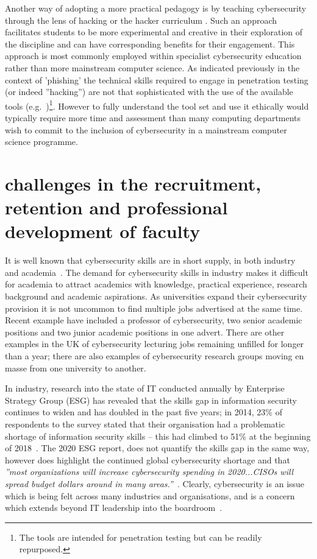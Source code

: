 \documentclass[conference]{IEEEtran}
\begin{document}
Another way of adopting a more practical pedagogy is by teaching cybersecurity through the lens of hacking or the hacker curriculum \cite{bratus2010teaching}. Such an approach facilitates students to be more experimental and creative in their exploration of the discipline and can have corresponding benefits for their engagement. This approach is most commonly employed within specialist cybersecurity education rather than more mainstream computer science. As indicated previously in the context of 'phishing' the technical skills required to engage in penetration testing (or indeed ''hacking'') are not that sophisticated with the use of the available tools (e.g.~\cite{KaliLinux,metasploit})\footnote{The tools are intended for penetration testing but can be readily repurposed. }. However to fully understand the tool set and use it ethically would typically require more time and assessment than many computing departments wish to commit to the inclusion of cybersecurity in a mainstream computer science programme.

\section{challenges in the recruitment, retention and professional development of faculty}\label{sec:staff}
It is well known that cybersecurity skills are in short supply, in both industry~\cite{Ackerman2019a} and academia~\cite{schneider2013,endicott2018searching}. The demand for cybersecurity skills in industry makes it difficult for academia to attract academics with knowledge, practical experience, research background and academic aspirations. As universities expand their cybersecurity provision it is not uncommon to find multiple jobs advertised at the same time. Recent example have included a professor of cybersecurity, two senior academic positions and two junior academic positions in one advert. There are other examples in the UK of cybersecurity lecturing jobs remaining unfilled for longer than a year; there are also examples of cybersecurity research groups moving en masse from one university to another.

In industry,
research into the state of IT conducted annually by Enterprise Strategy Group (ESG) has revealed that the skills gap in information security continues to widen and has doubled in the past five years; in 2014, 23\% of respondents to the survey stated that their organisation had a problematic shortage of information security skills -- this had climbed to 51\% at the beginning of 2018~\cite{ESG:2018}. The 2020 ESG report, does not quantify the skills gap in the same way, however does highlight the continued global cybersecurity shortage and that {\em''most organizations will increase cybersecurity spending in 2020...CISOs will spread budget dollars around in many areas.''}~\cite[p.1]{ESG:2020}. Clearly, cybersecurity is an issue which is being felt across many industries and organisations, and is a concern which extends beyond IT leadership into the boardroom~\cite{Ackerman2019a}.
\end{document}
